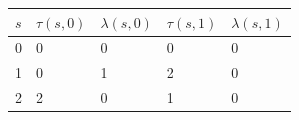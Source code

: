 \begin{tabular}{lllll}
\toprule
$s$ & $\tau(s,0)$ & $\lambda(s,0)$ & $\tau(s,1)$ & $\lambda(s,1)$ \\
\midrule
0 & 0 & 0 & 0 & 0 \\
1 & 0 & 1 & 2 & 0 \\
2 & 2 & 0 & 1 & 0 \\
\bottomrule
\end{tabular}
